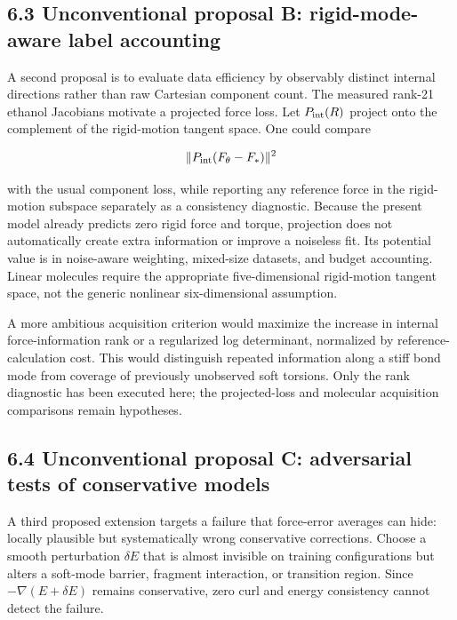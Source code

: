 \documentclass[
  11pt,
  a4paper,
]{article}
\begin{document}
\hypertarget{unconventional-proposal-b-rigid-mode-aware-label-accounting}{%
\subsection{6.3 Unconventional proposal B: rigid-mode-aware label
accounting}\label{unconventional-proposal-b-rigid-mode-aware-label-accounting}}

A second proposal is to evaluate data efficiency by observably distinct
internal directions rather than raw Cartesian component count. The
measured rank-21 ethanol Jacobians motivate a projected force loss. Let
\(P_{\rm int}(R)\) project onto the complement of the rigid-motion
tangent space. One could compare

\[\|P_{\rm int}(F_\theta-F_*)\|^2\]

with the usual component loss, while reporting any reference force in
the rigid-motion subspace separately as a consistency diagnostic.
Because the present model already predicts zero rigid force and torque,
projection does not automatically create extra information or improve a
noiseless fit. Its potential value is in noise-aware weighting,
mixed-size datasets, and budget accounting. Linear molecules require the
appropriate five-dimensional rigid-motion tangent space, not the generic
nonlinear six-dimensional assumption.

A more ambitious acquisition criterion would maximize the increase in
internal force-information rank or a regularized log determinant,
normalized by reference-calculation cost. This would distinguish
repeated information along a stiff bond mode from coverage of previously
unobserved soft torsions. Only the rank diagnostic has been executed
here; the projected-loss and molecular acquisition comparisons remain
hypotheses.

\hypertarget{unconventional-proposal-c-adversarial-tests-of-conservative-models}{%
\subsection{6.4 Unconventional proposal C: adversarial tests of
conservative
models}\label{unconventional-proposal-c-adversarial-tests-of-conservative-models}}

A third proposed extension targets a failure that force-error averages
can hide: locally plausible but systematically wrong conservative
corrections. Choose a smooth perturbation \(\delta E\) that is almost
invisible on training configurations but alters a soft-mode barrier,
fragment interaction, or transition region. Since
\(-\nabla(E+\delta E)\) remains conservative, zero curl and energy
consistency cannot detect the failure.
\end{document}
